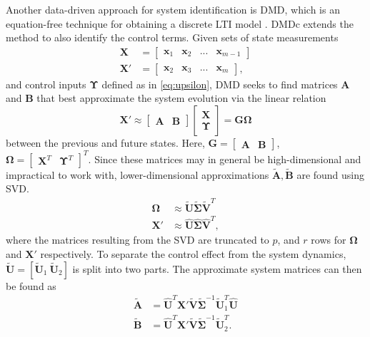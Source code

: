 \documentclass[../main.tex]{subfiles}
\begin{document}
Another data-driven approach for system identification is DMD, which is an equation-free technique for obtaining a discrete LTI model \cite{schmid2010}. DMDc \cite{proctor2016} extends the method to also identify the control terms. Given sets of state measurements
\begin{align}
    \bm{X} &= \begin{bmatrix}
        \bm{x}_1 & \bm{x}_2 & ... & \bm{x}_{m-1}
    \end{bmatrix} \\
    \bm{X}' &= \begin{bmatrix}
        \bm{x}_2 & \bm{x}_3 & ... & \bm{x}_{m}
    \end{bmatrix},
\end{align}
and control inputs $\bm{\Upsilon}$ defined as in \cref{eq:upsilon}, DMD seeks to find matrices $\bm{A}$ and $\bm{B}$ that best approximate the system evolution via the linear relation
\begin{equation}
    \bm{X}' \approx \begin{bmatrix}
        \bm{A} & \bm{B}
    \end{bmatrix}\begin{bmatrix}
        \bm{X} \\ \bm{\Upsilon}
    \end{bmatrix} = \bm{G}\bm{\Omega}
\end{equation}
between the previous and future states. Here,
$\bm{G} = \begin{bmatrix}
    \bm{A} & \bm{B}
\end{bmatrix}$, $\bm{\Omega} = \begin{bmatrix}
    \bm{X}^T & \bm{\Upsilon}^T
\end{bmatrix}^T.$ Since these matrices may in general be high-dimensional and impractical to work with, lower-dimensional approximations $\tilde{\bm{A}}, \tilde{\bm{B}}$ are found using SVD.
\begin{subequations}
\begin{align}
    \bm{\Omega} &\approx \tilde{\bm{U}} \tilde{\bm{\Sigma}} \tilde{\bm{V}}^T \\
    \bm{X}' &\approx \hat{\bm{U}} \hat{\bm{\Sigma}} \hat{\bm{V}}^T,
\end{align}
\end{subequations}
where the matrices resulting from the SVD are truncated to $p$, and $r$ rows for $\bm{\Omega}$ and $\bm{X}'$ respectively. To separate the control effect from the system dynamics, $\tilde{\bm{U}} = [\tilde{\bm{U}}_1 \ \tilde{\bm{U}}_2]$ is split into two parts. The approximate system matrices can then be found as
\begin{subequations}
\begin{align}
    \tilde{\bm{A}} &= \hat{\bm{U}}^T \bm{X}' \tilde{\bm{V}} \tilde{\bm{\Sigma}}^{-1} \tilde{\bm{U}}^T_1\hat{\bm{U}} \\
    \tilde{\bm{B}} &= \hat{\bm{U}}^T \bm{X}' \tilde{\bm{V}} \tilde{\bm{\Sigma}}^{-1} \tilde{\bm{U}}^T_2.
\end{align}
\end{subequations}
\end{document}

